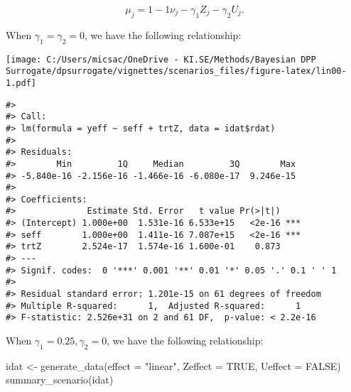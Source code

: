 \documentclass[
]{article}
\newenvironment{Shaded}{\begin{snugshade}}{\end{snugshade}}
\newcommand{\AttributeTok}[1]{\textcolor[rgb]{0.77,0.63,0.00}{#1}}
\newcommand{\CommentTok}[1]{\textcolor[rgb]{0.56,0.35,0.01}{\textit{#1}}}
\newcommand{\ConstantTok}[1]{\textcolor[rgb]{0.00,0.00,0.00}{#1}}
\newcommand{\FunctionTok}[1]{\textcolor[rgb]{0.00,0.00,0.00}{#1}}
\newcommand{\NormalTok}[1]{#1}
\newcommand{\OtherTok}[1]{\textcolor[rgb]{0.56,0.35,0.01}{#1}}
\newcommand{\StringTok}[1]{\textcolor[rgb]{0.31,0.60,0.02}{#1}}
\begin{document}
\[\mu_j = 1 - 1 \nu_j - \gamma_1 Z_j - \gamma_2 U_j.\]

When \(\gamma_1 = \gamma_2 = 0\), we have the following relationship:

\begin{Shaded}
\end{Shaded}

\texttt{[image: C:/Users/micsac/OneDrive - KI.SE/Methods/Bayesian DPP Surrogate/dpsurrogate/vignettes/scenarios\_files/figure-latex/lin00-1.pdf]}

\begin{verbatim}
#> 
#> Call:
#> lm(formula = yeff ~ seff + trtZ, data = idat$rdat)
#> 
#> Residuals:
#>        Min         1Q     Median         3Q        Max 
#> -5.840e-16 -2.156e-16 -1.466e-16 -6.080e-17  9.246e-15 
#> 
#> Coefficients:
#>              Estimate Std. Error   t value Pr(>|t|)    
#> (Intercept) 1.000e+00  1.531e-16 6.533e+15   <2e-16 ***
#> seff        1.000e+00  1.411e-16 7.087e+15   <2e-16 ***
#> trtZ        2.524e-17  1.574e-16 1.600e-01    0.873    
#> ---
#> Signif. codes:  0 '***' 0.001 '**' 0.01 '*' 0.05 '.' 0.1 ' ' 1
#> 
#> Residual standard error: 1.201e-15 on 61 degrees of freedom
#> Multiple R-squared:      1,  Adjusted R-squared:      1 
#> F-statistic: 2.526e+31 on 2 and 61 DF,  p-value: < 2.2e-16
\end{verbatim}

When \(\gamma_1 = 0.25, \gamma_2 = 0\), we have the following
relationship:

\begin{Shaded}
\begin{Highlighting}[]
\NormalTok{idat }\OtherTok{\textless{}{-}} \FunctionTok{generate\_data}\NormalTok{(}\AttributeTok{effect =} \StringTok{"linear"}\NormalTok{, }\AttributeTok{Zeffect =} \ConstantTok{TRUE}\NormalTok{, }\AttributeTok{Ueffect =} \ConstantTok{FALSE}\NormalTok{)}
\FunctionTok{summary\_scenario}\NormalTok{(idat)}
\end{Highlighting}
\end{Shaded}
\end{document}
